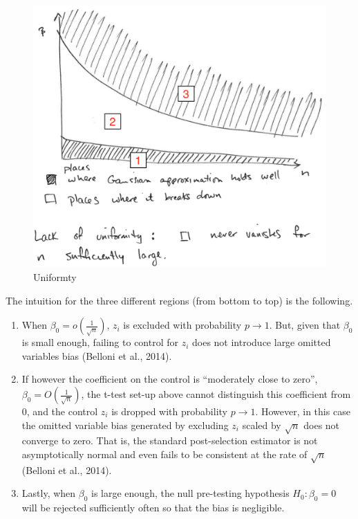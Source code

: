\documentclass[12pt,]{book}
\providecommand{\tightlist}{%
  \setlength{\itemsep}{0pt}\setlength{\parskip}{0pt}}
\begin{document}
\begin{figure}
\centering
\includegraphics{figures/Fig_623.png}
\caption{Uniformty}
\end{figure}

The intuition for the three different regions (from bottom to top) is the following.

\begin{enumerate}
\def\labelenumi{\arabic{enumi}.}
\tightlist
\item
  When \(\beta_0 = o \left( \frac{1}{\sqrt{n}} \right)\), \(z_i\) is excluded with probability \(p \to 1\). But, given that \(\beta_0\) is small enough, failing to control for \(z_i\) does not introduce large omitted variables bias (Belloni et al., 2014).
\item
  If however the coefficient on the control is ``moderately close to zero'', \(\beta_0 = O \left( \frac{1}{\sqrt{n}} \right)\), the t-test set-up above cannot distinguish this coefficient from \(0\), and the control \(z_i\) is dropped with probability \(p \to 1\). However, in this case the omitted variable bias generated by excluding \(z_i\) scaled by \(\sqrt{n}\) does not converge to zero. That is, the standard post-selection estimator is not asymptotically normal and even fails to be consistent at the rate of \(\sqrt{n}\) (Belloni et al., 2014).
\item
  Lastly, when \(\beta_0\) is large enough, the null pre-testing hypothesis \(H_0 : \beta_0 = 0\) will be rejected sufficiently often so that the bias is negligible.
\end{enumerate}
\end{document}
